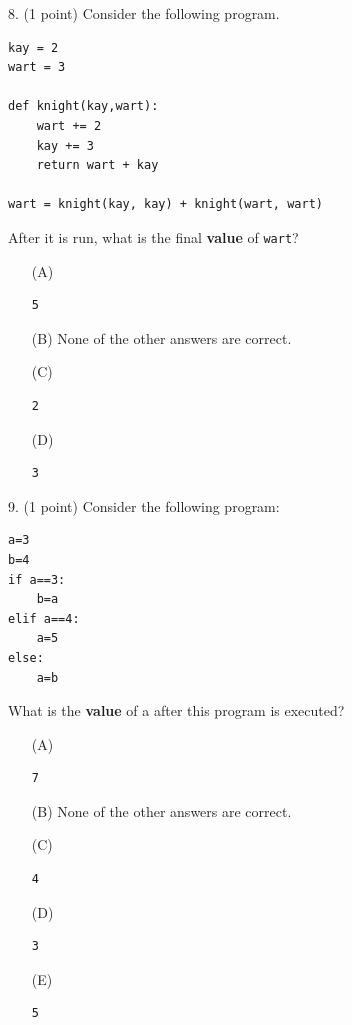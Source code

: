 \documentclass{article}
\begin{document}
\noindent
\begin{minipage}{\textwidth}
8. (1 point)
Consider the following program.
\begin{verbatim}
kay = 2
wart = 3

def knight(kay,wart):
    wart += 2
    kay += 3
    return wart + kay

wart = knight(kay, kay) + knight(wart, wart)
\end{verbatim}
After it is run, what is the final \textbf{value} of \texttt{wart}?

\begin{enumerate}
\item[(A)]
\begin{verbatim}5\end{verbatim}

\item[(B)]
None of the other answers are correct.

\item[(C)]
\begin{verbatim}2\end{verbatim}

\item[(D)]
\begin{verbatim}3\end{verbatim}

\end{enumerate}
\end{minipage}
\vspace{2em}
\filbreak\vfil{}\vfilneg

\noindent
\begin{minipage}{\textwidth}
9. (1 point)
Consider the following program:
\begin{verbatim}
a=3
b=4
if a==3:
    b=a
elif a==4:
    a=5
else:
    a=b
\end{verbatim}
What is the \textbf{value} of a after this program is executed?

\begin{enumerate}
\item[(A)]
\begin{verbatim}7\end{verbatim}

\item[(B)]
None of the other answers are correct.

\item[(C)]
\begin{verbatim}4\end{verbatim}

\item[(D)]
\begin{verbatim}3\end{verbatim}

\item[(E)]
\begin{verbatim}5\end{verbatim}

\end{enumerate}
\end{minipage}
\vspace{2em}
\filbreak\vfil{}\vfilneg
\end{document}
